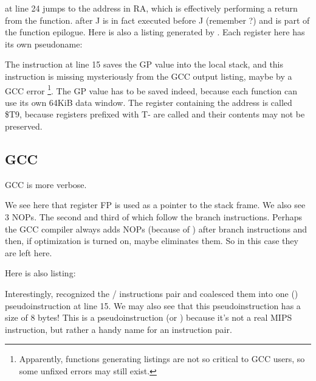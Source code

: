 
 at line 24 jumps to the address in \ac{RA}, which is effectively performing a return from the function.
 after J is in fact executed before J (remember ?) and is part of the function epilogue.
Here is also a listing generated by \IDA. Each register here has its own pseudoname:



The instruction at line 15 saves the GP value into the local stack, and this instruction is missing mysteriously from the GCC output listing, maybe by a GCC error
\footnote{Apparently, functions generating listings are not so critical to GCC users, so some unfixed errors may still exist.}.
The GP value has to be saved indeed, because each function can use its own 64KiB data window.
The register containing the \puts address is called \$T9, because registers prefixed with T- are called
 and their contents may not be preserved.

\subsection{\NonOptimizing GCC}

\NonOptimizing GCC is more verbose.



We see here that register FP is used as a pointer to the stack frame.
We also see 3 \ac{NOP}s.
The second and third of which follow the branch instructions.
Perhaps the GCC compiler always adds \ac{NOP}s (because of ) after branch
instructions and then, if optimization is turned on, maybe eliminates them.
So in this case they are left here.

Here is also \IDA listing:




Interestingly, \IDA recognized the / instructions pair and coalesced them into one 
 () pseudoinstruction at line 15.
We may also see that this pseudoinstruction has a size of 8 bytes!
This is a pseudoinstruction (or ) because it's not a real MIPS instruction, but rather
a handy name for an instruction pair.

